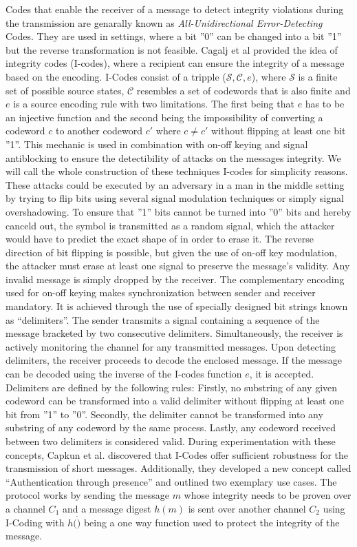 \documentclass[conference]{IEEEtran}
\begin{document}
Codes that enable the receiver of a message to detect integrity violations during the transmission are genarally known as \textit{All-Unidirectional Error-Detecting} Codes.
They are used in settings, where a bit ''0'' can be changed into a bit ''1'' but the reverse transformation is not feasible. 
Cagalj et al provided the idea of integrity codes (I-codes), where a recipient can ensure the integrity of a message based on the encoding.
I-Codes consist of a tripple ($ \mathcal{S}, \mathcal{C}, e$), where $\mathcal{S}$ is a finite set of possible source states, $\mathcal{C}$ resembles a set of codewords that is also finite and $e$ is a source encoding rule with two limitations.
The first being that $e$ has to be an injective function and the second being the impossibility of converting a codeword $c$ to another codeword $c'$ where $c \neq c'$ without flipping at least one bit ''1''.
This mechanic is used in combination with on-off keying and signal antiblocking to ensure the detectibility of attacks on the messages integrity. We will call the whole construction of these techniques I-codes for simplicity reasons.
These attacks could be executed by an adversary in a man in the middle setting by trying to flip bits using several signal modulation techniques or simply signal overshadowing.
To ensure that ''1'' bits cannot be turned into ''0'' bits and hereby canceld out, the symbol is transmitted as a random signal, which the attacker would have to predict the exact shape of in order to erase it.
The reverse direction of bit flipping is possible, but given the use of on-off key modulation, the attacker must erase at least one signal to preserve the message's validity. Any invalid message is simply dropped by the receiver.
The complementary encoding used for on-off keying makes synchronization between sender and receiver mandatory. It is achieved through the use of specially designed bit strings known as ``delimiters''. The sender transmits a signal containing a sequence of the message bracketed by two consecutive delimiters. Simultaneously, the receiver is actively monitoring the channel for any transmitted messages. 
Upon detecting delimiters, the receiver proceeds to decode the enclosed message. If the message can be decoded using the inverse of the I-codes function $e$, it is accepted. Delimiters are defined by the following rules: Firstly, no substring of any given codeword can be transformed into a valid delimiter without flipping at least one bit from ''1'' to ''0''. Secondly, the delimiter cannot be transformed into any substring of any codeword by the same process. Lastly, any codeword received between two delimiters is considered valid.
During experimentation with these concepts, Capkun et al. discovered that I-Codes offer sufficient robustness for the transmission of short messages. Additionally, they developed a new concept called ``Authentication through presence'' and outlined two exemplary use cases.
The protocol works by sending the message $m$ whose integrity needs to be proven over a channel $C_1$ and a message digest $h(m)$ is sent over another channel $C_2$ using I-Coding with $h(\dot)$ being a one way function used to protect the integrity of the  message.
\end{document}
